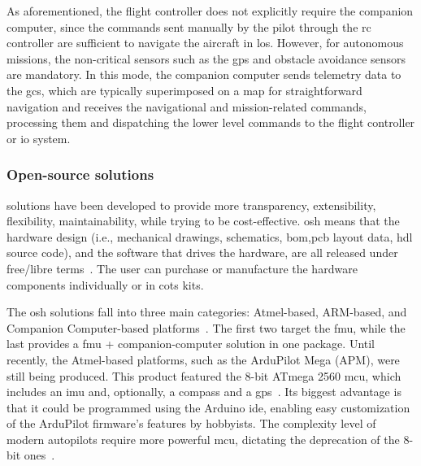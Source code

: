 As aforementioned, the flight controller does not explicitly require the
companion computer, since the commands sent manually by the pilot
through the \gls{rc} controller are sufficient to navigate the aircraft
in \gls{los}. However, for autonomous missions, the non-critical
sensors such as the \gls{gps} and obstacle avoidance sensors are mandatory. In
this mode, the companion computer sends telemetry data to the \gls{gcs}, which
are typically superimposed on a map for straightforward navigation and receives
the navigational and mission-related commands, processing them and dispatching
the lower level commands to the flight controller or \gls{io} system.

\subsubsection{Open-source solutions}%
\label{sec:open-source-solut-hw}
 solutions have been developed to provide more transparency,
extensibility, flexibility, maintainability, while trying to be
cost-effective. \gls{osh} means that the hardware design (i.e., mechanical
drawings, schematics, \gls{bom},\gls{pcb} layout data, \gls{hdl} source code),
and the software that drives the hardware, are all released under free/libre
terms~\cite{freeGNU}.
The user can purchase or manufacture the hardware components
individually or in \gls{cots} kits.

The \gls{osh} solutions fall into three main categories: Atmel-based,
ARM-based, and Companion Computer-based
platforms~\cite{ebeidUAVPlatformsSurvey2017}. The first two target the
\gls{fmu}, while the last provides a \gls{fmu} + companion-computer solution in
one package. Until recently, the Atmel-based platforms, such as the ArduPilot
Mega (APM), were still being produced. This product featured the 8-bit ATmega 2560 \gls{mcu}, which includes an \gls{imu} and, optionally, a
compass and a \gls{gps}~\cite{ardupilotMega}. Its biggest advantage is that it could be programmed using the
Arduino \gls{ide}, enabling easy customization of the ArduPilot firmware's
features by hobbyists. The complexity level of modern autopilots require more
powerful \gls{mcu}, dictating the deprecation of the 8-bit
ones~\cite{fmu8BitDeprecation}.

